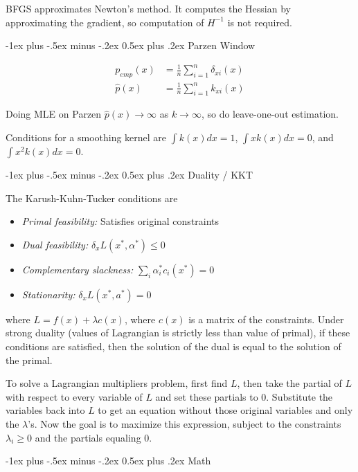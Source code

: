 \documentclass[10pt,landscape]{article}
\makeatletter
\renewcommand{\section}{\@startsection{section}{1}{0mm}%
                                {-1ex plus -.5ex minus -.2ex}%
                                {0.5ex plus .2ex}%
                                {\normalfont\large\bfseries}}
\makeatother
\begin{document}
\begin{multicols}{3}
BFGS approximates Newton's method. It computes the Hessian by approximating the gradient, so computation of $H^{-1}$ is not required.

\section{Parzen Window}

\begin{align*}
p_{emp}(x) &= \frac{1}{n} \sum_{i = 1}^{n} \delta_{xi}(x)\\
\hat{p}(x) &= \frac{1}{n} \sum_{i = 1}^{n} k_{xi}(x)
\end{align*}

Doing MLE on Parzen $\hat{p}(x) \rightarrow \infty$ as $k \rightarrow \infty$, so do leave-one-out estimation.

Conditions for a smoothing kernel are $\int k(x) dx = 1$, $\int x k(x) dx = 0$, and $\int x^2 k(x) dx = 0$.

\section{Duality / KKT}

The Karush-Kuhn-Tucker conditions are
\begin{itemize}
	\item \emph{Primal feasibility:} Satisfies original constraints
	\item \emph{Dual feasibility:} $\delta_x L(x^*, \alpha^*) \leq 0$
	\item \emph{Complementary slackness:} $\sum_{i} \alpha_i^* c_i(x^*) = 0$
	\item \emph{Stationarity:} $\delta_x L(x^*, a^*) = 0$
\end{itemize}
where $L = f(x) + \lambda c(x)$, where $c(x)$ is a matrix of the constraints. Under strong duality (values of Lagrangian is strictly less than value of primal), if these conditions are satisfied, then the solution of the dual is equal to the solution of the primal.

To solve a Lagrangian multipliers problem, first find $L$, then take the partial of $L$ with respect to every variable of $L$ and set these partials to 0. Substitute the variables back into $L$ to get an equation without those original variables and only the $\lambda$'s. Now the goal is to maximize this expression, subject to the constraints $\lambda_i \geq 0$ and the partials equaling 0.

\section{Math}


\end{multicols}
\end{document}
